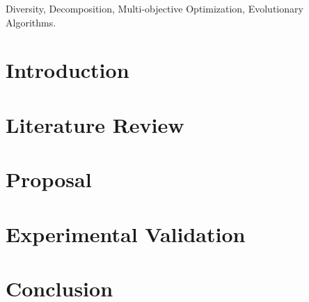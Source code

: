 \documentclass[journal]{IEEEtran}
\begin{document}
\begin{IEEEkeywords}
Diversity, Decomposition, Multi-objective Optimization, Evolutionary Algorithms. 
\end{IEEEkeywords}






%
\IEEEpeerreviewmaketitle

\section{Introduction}


\section{Literature Review}
\label{Sec:LiteratureReview}


\section{Proposal}
\label{Sec:Proposal}



\section{Experimental Validation}
\label{Sec:ExperimentalValidation}


\section{Conclusion}
\label{Sec:Conclusion}


%
\end{document}
